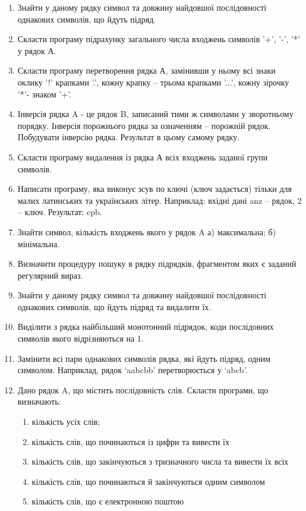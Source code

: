 \documentclass[]{article}
\makeatletter
\newcommand{\xslalph}[1]{\expandafter\@xslalph\csname c@#1\endcsname}
\newcommand{\@xslalph}[1]{%
    \ifcase#1\or а\or б\or в\or г\or д\or e\or є\or ж\or з\or i%
    \or й\or к\or л\or м\or н\or о\or п\or р\or с\or т%
    \or у\or ф\or х\or ц\or ч\or ш\or ю\or я\or аа\or бб\or вв %
    \else\@ctrerr\fi%
}
\makeatother
\begin{document}
\begin{enumerate}
\begin{enumerate}[label=\xslalph*)]
\end{enumerate}
\item  Знайти у даному рядку символ та довжину найдовшої послідовності однакових символів, що йдуть підряд.

\item   Скласти  програму підрахунку загального числа входжень символів '+', '-', '*' у рядок А.
\item   Скласти  програму перетворення рядка А, замінивши у ньому всі знаки оклику '!' крапками '.', кожну крапку – трьома крапками '...', кожну зірочку '*'- знаком '+'.

\item  Інверсія рядка A - це рядок B, записаний тими ж символами у зворотньому порядку. Інверсія порожнього рядка за означенням – порожній рядок. Побудувати інверсію рядка. Результат в цьому самому рядку.
\item   Скласти програму видалення із рядка А всіх входжень заданої групи символів.
\item   Написати програму, яка виконує зсув по ключі (ключ задається) тільки для малих латинських та українських літер. Наприклад: вхідні дані  anz – рядок, 2 – ключ. Результат: cpb.
\item  Знайти символ, кількість входжень якого у рядок A
а) максимальна;
б) мінімальна.

\item  Визначити процедуру пошуку в рядку підрядків, фрагментом яких є заданий регулярний вираз. 

\item   Знайти у даному рядку символ та довжину найдовшої послідовності однакових символів, що йдуть підряд та видалити їх.

\item  Виділити з рядка найбільший монотонний підрядок, коди послідовних символів якого відрізняються на 1.

\item   Замінити всі пари однакових символів рядка, які йдуть підряд, одним символом. Наприклад, рядок ‘aabcbb’ перетворюється у ‘abcb’.


\item  
Дано рядок A, що містить послідовність слів. Скласти програми, що визначають:
\begin{enumerate}[label=\xslalph*)]
\item  кількість усіх слів;
\item кількість слів, що починаються із цифри та вивести їх
\item кількість слів, що закінчуються з тризначного числа та вивести їх всіх
\item кількість слів, що починаються й закінчуються одним символом
\item кількість слів, що є електронною поштою
\end{enumerate}


\end{enumerate}
\end{document}
